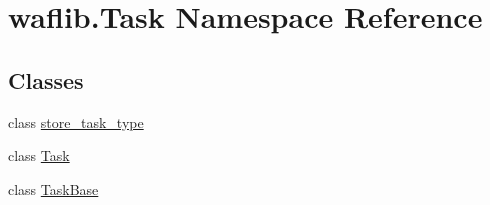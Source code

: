 \hypertarget{namespacewaflib_1_1_task}{}\section{waflib.\+Task Namespace Reference}
\label{namespacewaflib_1_1_task}
\subsection*{Classes}
\begin{DoxyCompactItemize}
\item 
class \hyperlink{classwaflib_1_1_task_1_1store__task__type}{store\+\_\+task\+\_\+type}
\item 
class \hyperlink{classwaflib_1_1_task_1_1_task}{Task}
\item 
class \hyperlink{classwaflib_1_1_task_1_1_task_base}{Task\+Base}
\end{DoxyCompactItemize}
